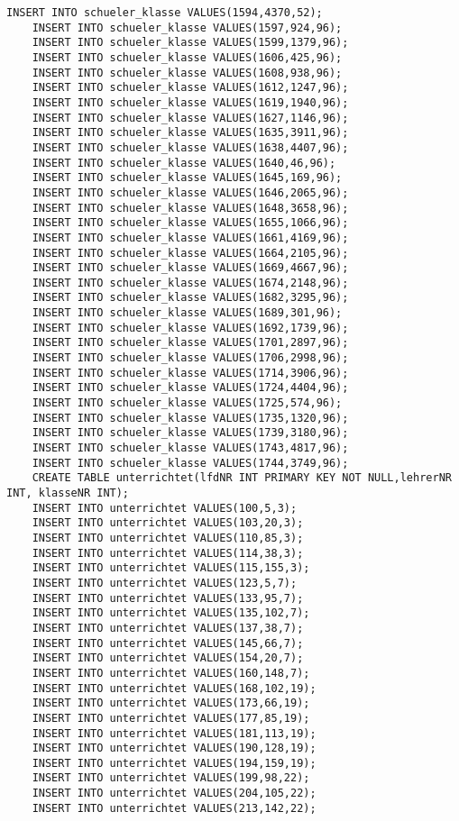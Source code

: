 \begin{lstlisting}[breaklines=True, numbers=none, basicstyle=\tiny, keepspaces=false]
	INSERT INTO schueler_klasse VALUES(1594,4370,52);
	INSERT INTO schueler_klasse VALUES(1597,924,96);
	INSERT INTO schueler_klasse VALUES(1599,1379,96);
	INSERT INTO schueler_klasse VALUES(1606,425,96);
	INSERT INTO schueler_klasse VALUES(1608,938,96);
	INSERT INTO schueler_klasse VALUES(1612,1247,96);
	INSERT INTO schueler_klasse VALUES(1619,1940,96);
	INSERT INTO schueler_klasse VALUES(1627,1146,96);
	INSERT INTO schueler_klasse VALUES(1635,3911,96);
	INSERT INTO schueler_klasse VALUES(1638,4407,96);
	INSERT INTO schueler_klasse VALUES(1640,46,96);
	INSERT INTO schueler_klasse VALUES(1645,169,96);
	INSERT INTO schueler_klasse VALUES(1646,2065,96);
	INSERT INTO schueler_klasse VALUES(1648,3658,96);
	INSERT INTO schueler_klasse VALUES(1655,1066,96);
	INSERT INTO schueler_klasse VALUES(1661,4169,96);
	INSERT INTO schueler_klasse VALUES(1664,2105,96);
	INSERT INTO schueler_klasse VALUES(1669,4667,96);
	INSERT INTO schueler_klasse VALUES(1674,2148,96);
	INSERT INTO schueler_klasse VALUES(1682,3295,96);
	INSERT INTO schueler_klasse VALUES(1689,301,96);
	INSERT INTO schueler_klasse VALUES(1692,1739,96);
	INSERT INTO schueler_klasse VALUES(1701,2897,96);
	INSERT INTO schueler_klasse VALUES(1706,2998,96);
	INSERT INTO schueler_klasse VALUES(1714,3906,96);
	INSERT INTO schueler_klasse VALUES(1724,4404,96);
	INSERT INTO schueler_klasse VALUES(1725,574,96);
	INSERT INTO schueler_klasse VALUES(1735,1320,96);
	INSERT INTO schueler_klasse VALUES(1739,3180,96);
	INSERT INTO schueler_klasse VALUES(1743,4817,96);
	INSERT INTO schueler_klasse VALUES(1744,3749,96);
	CREATE TABLE unterrichtet(lfdNR INT PRIMARY KEY NOT NULL,lehrerNR INT, klasseNR INT);
	INSERT INTO unterrichtet VALUES(100,5,3);
	INSERT INTO unterrichtet VALUES(103,20,3);
	INSERT INTO unterrichtet VALUES(110,85,3);
	INSERT INTO unterrichtet VALUES(114,38,3);
	INSERT INTO unterrichtet VALUES(115,155,3);
	INSERT INTO unterrichtet VALUES(123,5,7);
	INSERT INTO unterrichtet VALUES(133,95,7);
	INSERT INTO unterrichtet VALUES(135,102,7);
	INSERT INTO unterrichtet VALUES(137,38,7);
	INSERT INTO unterrichtet VALUES(145,66,7);
	INSERT INTO unterrichtet VALUES(154,20,7);
	INSERT INTO unterrichtet VALUES(160,148,7);
	INSERT INTO unterrichtet VALUES(168,102,19);
	INSERT INTO unterrichtet VALUES(173,66,19);
	INSERT INTO unterrichtet VALUES(177,85,19);
	INSERT INTO unterrichtet VALUES(181,113,19);
	INSERT INTO unterrichtet VALUES(190,128,19);
	INSERT INTO unterrichtet VALUES(194,159,19);
	INSERT INTO unterrichtet VALUES(199,98,22);
	INSERT INTO unterrichtet VALUES(204,105,22);
	INSERT INTO unterrichtet VALUES(213,142,22);

\end{lstlisting}
